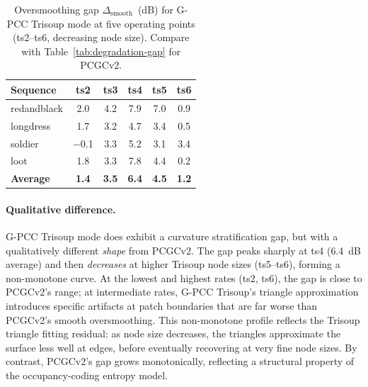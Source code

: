 \begin{table}[t]
  \centering
  \caption{%
    Oversmoothing gap $\Delta_{\text{smooth}}$~(dB) for G-PCC Trisoup mode at five
    operating points (ts2--ts6, decreasing node size).
    Compare with Table~\ref{tab:degradation-gap} for PCGCv2.
  }
  \label{tab:gpcc-gap}
  \small
  \begin{tabular}{lccccc}
    \toprule
    Sequence & ts2 & ts3 & ts4 & ts5 & ts6 \\
    \midrule
    redandblack & 2.0 & 4.2 & 7.9 & 7.0 & 0.9 \\
    longdress   & 1.7 & 3.2 & 4.7 & 3.4 & 0.5 \\
    soldier     & $-$0.1 & 3.3 & 5.2 & 3.1 & 3.4 \\
    loot        & 1.8 & 3.3 & 7.8 & 4.4 & 0.2 \\
    \midrule
    \textbf{Average} & \textbf{1.4} & \textbf{3.5} & \textbf{6.4} & \textbf{4.5} & \textbf{1.2} \\
    \bottomrule
  \end{tabular}
\end{table}

\paragraph{Qualitative difference.}
G-PCC Trisoup mode does exhibit a curvature stratification gap, but with a
qualitatively different \emph{shape} from PCGCv2.
The gap peaks sharply at ts4 (6.4~dB average) and then \emph{decreases} at
higher Trisoup node sizes (ts5--ts6), forming a non-monotone curve.
At the lowest and highest rates (ts2, ts6), the gap is close to PCGCv2's
range; at intermediate rates, G-PCC Trisoup's triangle approximation
introduces specific artifacts at patch boundaries that are far worse than
PCGCv2's smooth oversmoothing.
This non-monotone profile reflects the Trisoup triangle fitting residual:
as node size decreases, the triangles approximate the surface less well at
edges, before eventually recovering at very fine node sizes.
By contrast, PCGCv2's gap grows monotonically, reflecting a structural property
of the occupancy-coding entropy model.

